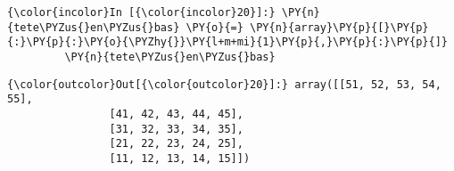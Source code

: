     \begin{Verbatim}[commandchars=\\\{\},frame=single,framerule=0.3mm,rulecolor=\color{cellframecolor}]
{\color{incolor}In [{\color{incolor}20}]:} \PY{n}{tete\PYZus{}en\PYZus{}bas} \PY{o}{=} \PY{n}{array}\PY{p}{[}\PY{p}{:}\PY{p}{:}\PY{o}{\PYZhy{}}\PY{l+m+mi}{1}\PY{p}{,}\PY{p}{:}\PY{p}{]}
         \PY{n}{tete\PYZus{}en\PYZus{}bas}
\end{Verbatim}


\begin{Verbatim}[commandchars=\\\{\},frame=single,framerule=0.3mm,rulecolor=\color{cellframecolor}]
{\color{outcolor}Out[{\color{outcolor}20}]:} array([[51, 52, 53, 54, 55],
                [41, 42, 43, 44, 45],
                [31, 32, 33, 34, 35],
                [21, 22, 23, 24, 25],
                [11, 12, 13, 14, 15]])
\end{Verbatim}
            

    
    
    
